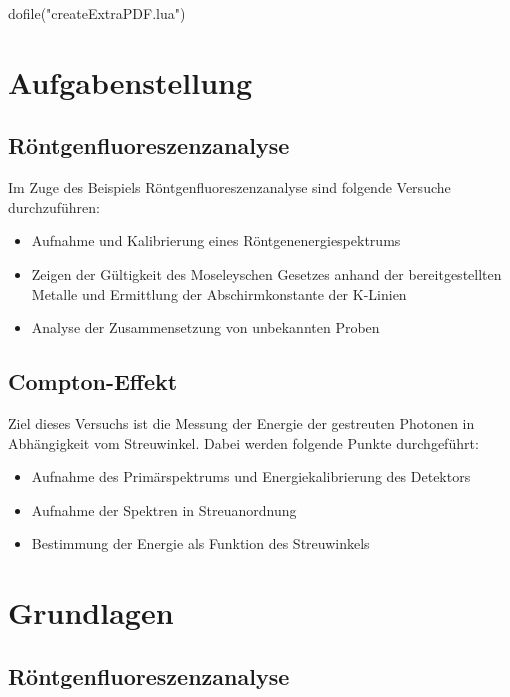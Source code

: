 \documentclass[12pt,english,ngerman]{scrartcl}
\begin{document}
\begin{luacode*}
	dofile("createExtraPDF.lua")
\end{luacode*}

%
\tableofcontents

\newpage

\section{Aufgabenstellung\label{Auf}}

\subsection{Röntgenfluoreszenzanalyse}

Im Zuge des Beispiels Röntgenfluoreszenzanalyse sind folgende Versuche durchzuführen:

\begin{itemize}
	\item Aufnahme und Kalibrierung eines Röntgenenergiespektrums
	\item Zeigen der Gültigkeit des Moseleyschen Gesetzes anhand der bereitgestellten Metalle und 
	Ermittlung der Abschirmkonstante der K-Linien
	\item Analyse der Zusammensetzung von unbekannten Proben
\end{itemize}

\subsection{Compton-Effekt}

Ziel dieses Versuchs ist die Messung der Energie der gestreuten Photonen in Abhängigkeit vom Streuwinkel. 
Dabei werden folgende Punkte durchgeführt:

\begin{itemize}
	\item Aufnahme des Primärspektrums und Energiekalibrierung des Detektors
	\item Aufnahme der Spektren in Streuanordnung
	\item Bestimmung der Energie als Funktion des Streuwinkels
\end{itemize}


\section{Grundlagen}\label{Grund}


\subsection{Röntgenfluoreszenzanalyse}
\end{document}
